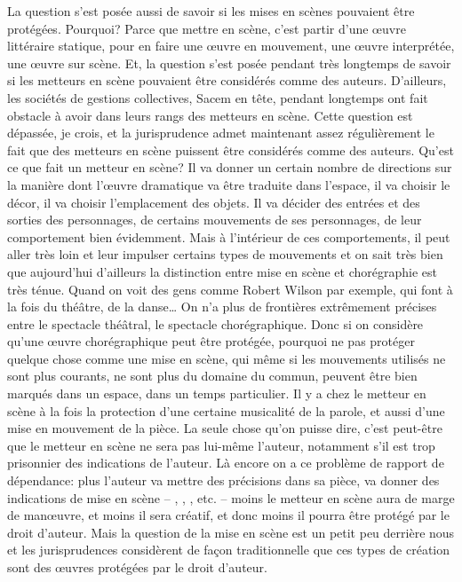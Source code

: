 {La question s'est pos\'ee aussi de savoir si les mises en
sc\`enes pouvaient \^etre prot\'eg\'ees. Pourquoi? Parce que mettre en
sc\`ene, c'est partir d'une {\oe}uvre litt\'eraire statique, pour en
faire une {\oe}uvre en mouvement, une {\oe}uvre interpr\'et\'ee, une
{\oe}uvre sur sc\`ene. Et, la question s'est pos\'ee pendant tr\`es
longtemps de savoir si les metteurs en sc\`ene pouvaient \^etre
consid\'er\'es comme des auteurs. D'ailleurs, les soci\'et\'es de
gestions collectives, Sacem en t\^ete, pendant
longtemps ont fait obstacle \`a avoir dans leurs rangs des metteurs en
sc\`ene. Cette question est d\'epass\'ee, je crois, et la jurisprudence
admet maintenant assez r\'eguli\`erement le fait que des metteurs en
sc\`ene puissent \^etre consid\'er\'es comme des auteurs. Qu'est ce que
fait un metteur en sc\`ene? Il va donner un certain nombre de
directions sur la mani\`ere dont l'{\oe}uvre dramatique va \^etre
traduite dans l'espace, il va choisir le d\'ecor, il va choisir
l'emplacement des objets. Il va d\'ecider des entr\'ees et des sorties
des personnages, de certains mouvements de ses personnages, de leur
comportement bien \'evidemment. Mais \`a l'int\'erieur de ces
comportements, il peut aller tr\`es loin et leur impulser certains
types de mouvements et on sait tr\`es bien que aujourd'hui d'ailleurs
la distinction entre mise en sc\`ene et chor\'egraphie est tr\`es
t\'enue. Quand on voit des gens comme Robert Wilson par exemple, qui
font \`a la fois du th\'e\^atre, de la danse{\dots} On n'a plus de
fronti\`eres extr\^emement pr\'ecises entre le spectacle th\'e\^atral,
le spectacle chor\'egraphique. Donc si on consid\`ere qu'une {\oe}uvre
chor\'egraphique peut \^etre prot\'eg\'ee, pourquoi ne pas prot\'eger
quelque chose comme une mise en sc\`ene, qui m\^eme si les mouvements
utilis\'es ne sont plus courants, ne sont plus du domaine du commun,
peuvent \^etre bien marqu\'es dans un espace, dans un temps
particulier. Il y a chez le metteur en sc\`ene \`a la fois la
protection d'une certaine musicalit\'e de la parole, et aussi d'une
mise en mouvement de la pi\`ece. La seule chose qu'on puisse dire,
c'est peut{}-\^etre que le metteur en sc\`ene ne sera pas lui{}-m\^eme
l'auteur, notamment s'il est trop prisonnier des indications de
l'auteur. L\`a encore on a ce probl\`eme de rapport de
d\'ependance: plus l'auteur va mettre des pr\'ecisions dans sa pi\`ece,
va donner des indications de mise en sc\`ene {--} , , , etc. {--} moins le metteur en sc\`ene aura
de marge de man{\oe}uvre, et moins il sera cr\'eatif, et donc moins il
pourra \^etre prot\'eg\'e par le droit d'auteur. Mais la question de la
mise en sc\`ene est un petit peu derri\`ere nous et les jurisprudences
consid\`erent de fa\c{c}on traditionnelle que ces types de cr\'eation
sont des {\oe}uvres prot\'eg\'ees par le droit d'auteur.\par

}
